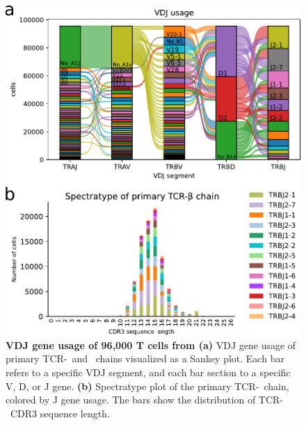 \documentclass{article}
\begin{document}
\newpage
\begin{figure}[!ht]
  \centering
  \includegraphics[width=7in]{../figures/gene_usage.pdf}
  \caption{\textbf{VDJ gene usage of 96,000 T cells from \textcite{Wu2020-vp}} \textbf{(a)} VDJ gene usage of primary TCR-\textalpha\ and \textbeta\ chains visualized as a Sankey plot. Each bar refers to a specific VDJ segment, and each bar section to a specific V, D, or J gene. \textbf{(b)} Spectratype plot of the primary TCR-\textbeta\ chain, colored by J gene usage. The bars show the distribution of TCR-\textbeta\ CDR3 sequence length.}
\end{figure}
\end{document}
